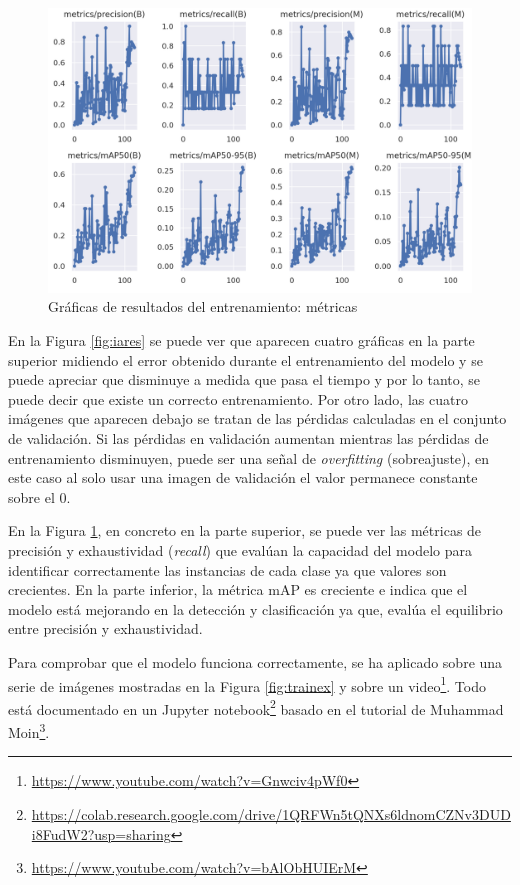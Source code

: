  \begin{figure} [h!]
	\begin{center}
		\includegraphics[width=15cm]{figs/cap6/results1.png}
	\end{center}
	\caption{Gráficas de resultados del entrenamiento: métricas}
	\label{fig:iares2}
\end{figure}

En la Figura \ref{fig:iares} se puede ver que aparecen cuatro gráficas en la parte superior midiendo el error obtenido durante el entrenamiento del modelo y se puede apreciar que disminuye a medida que pasa el tiempo y por lo tanto, se puede decir que existe un correcto entrenamiento. Por otro lado, las cuatro imágenes que aparecen debajo se tratan de las pérdidas calculadas en el conjunto de validación. Si las pérdidas en validación aumentan mientras las pérdidas de entrenamiento disminuyen, puede ser una señal de \textit{overfitting} (sobreajuste), en este caso al solo usar una imagen de validación el valor permanece constante sobre el 0.

En la Figura \ref{fig:iares2}, en concreto en la parte superior, se puede ver las métricas de precisión y exhaustividad (\textit{recall}) que evalúan la capacidad del modelo para identificar correctamente las instancias de cada clase ya que valores son crecientes. En la parte inferior, la métrica \ac{mAP} es creciente e indica que el modelo está mejorando en la detección y clasificación ya que, evalúa el equilibrio entre precisión y exhaustividad.

Para comprobar que el modelo funciona correctamente, se ha aplicado sobre una serie de imágenes mostradas en la Figura \ref{fig:trainex} y sobre un video\footnote{\url{https://www.youtube.com/watch?v=Gnwciv4pWf0}}. Todo está documentado en un Jupyter notebook\footnote{\url{https://colab.research.google.com/drive/1QRFWn5tQNXs6ldnomCZNv3DUDi8FudW2?usp=sharing}} basado en el tutorial de Muhammad Moin\footnote{\url{https://www.youtube.com/watch?v=bAlObHUIErM}}.

